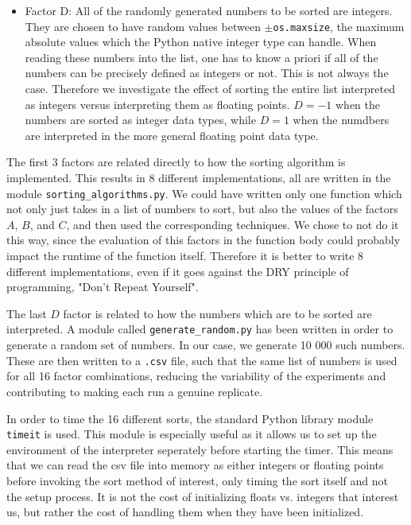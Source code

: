 \begin{itemize}
    \item Factor D: All of the randomly generated numbers to be sorted are integers. They are chosen to have random values between $\pm$\texttt{os.maxsize}, the maximum absolute values which the Python native integer type can handle. When reading these numbers into the list, one has to know a priori if all of the numbers can be precisely defined as integers or not. This is not always the case. Therefore we investigate the effect of sorting the entire list interpreted as integers versus interpreting them as floating points. $D=-1$ when the numbers are sorted as integer data types, while $D=1$ when the numdbers are interpreted in the more general floating point data type.
\end{itemize}

The first 3 factors are related directly to how the sorting algorithm is implemented. This results in 8 different implementations, all are written in the module \texttt{sorting{\_}algorithms.py}. We could have written only one function which not only just takes in a list of numbers to sort, but also the values of the factors $A$, $B$, and $C$, and then used the corresponding techniques. We chose to not do it this way, since the evaluation of this factors in the function body could probably impact the runtime of the function itself. Therefore it is better to write 8 different implementations, even if it goes against the DRY principle of programming, "Don't Repeat Yourself".

The last $D$ factor is related to how the numbers which are to be sorted are interpreted. A module called \texttt{generate{\_}random.py} has been written in order to generate a random set of numbers. In our case, we generate 10 000 such numbers. These are then written to a \texttt{.csv} file, such that the same list of numbers is used for all 16 factor combinations, reducing the variability of the experiments and contributing to making each run a genuine replicate.

In order to time the 16 different sorts, the standard Python library module \texttt{timeit} is used. This module is especially useful as it allows us to set up the environment of the interpreter seperately before starting the timer. This means that we can read the csv file into memory as either integers or floating points before invoking the sort method of interest, only timing the sort itself and not the setup process. It is not the cost of initializing floats vs. integers that interest us, but rather the cost of handling them when they have been initialized.

